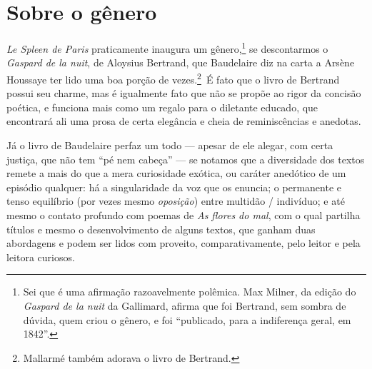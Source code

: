 
\section{Sobre o gênero}
\textit{Le Spleen de Paris} praticamente inaugura um gênero,\footnote{
Sei que é uma afirmação razoavelmente polêmica. Max Milner, da edição
do \textit{Gaspard de la nuit} da Gallimard, afirma que foi Bertrand, sem sombra
de dúvida, quem criou o gênero, e foi “publicado, para a indiferença
geral, em 1842”.} se descontarmos o \textit{Gaspard de la nuit}, de
Aloysius Bertrand, que Baudelaire diz na carta a Arsène Houssaye ter
lido uma boa porção de vezes.\footnote{ Mallarmé também adorava o livro
de Bertrand.}~É fato que o livro de Bertrand possui seu charme, mas é
igualmente fato que não se propõe ao rigor da concisão poética, e
funciona mais como um regalo para o diletante educado, que encontrará
ali uma prosa de certa elegância e cheia de reminiscências e anedotas.

%
%

Já o livro de Baudelaire perfaz um todo --- apesar de ele alegar, com certa
justiça, que não tem “pé nem cabeça” --- se notamos que a diversidade dos
textos remete a mais do que a mera curiosidade exótica, ou caráter
anedótico de um episódio qualquer: há a singularidade da voz que os
enuncia; o permanente e tenso equilíbrio (por vezes mesmo
\textit{oposição}) entre multidão / indivíduo; e até mesmo o contato
profundo com poemas de \textit{As flores do mal}, com o qual partilha
títulos e mesmo o desenvolvimento de alguns textos, que ganham duas
abordagens e podem ser lidos com proveito, comparativamente, pelo
leitor e pela leitora curiosos.

